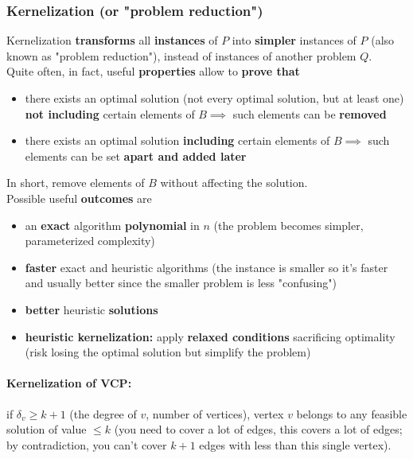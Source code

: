 \newpage

\subsubsection{Kernelization (or "problem reduction")}
Kernelization \textbf{transforms} all \textbf{instances} of $P$ into \textbf{simpler} instances of $P$ (also known as "problem reduction"), instead of instances of another problem $Q$.\\

Quite often, in fact, useful \textbf{properties} allow to \textbf{prove that}
\begin{itemize}
	\item there exists an optimal solution (not every optimal solution, but at least one) \textbf{not including} certain elements of $B \implies$ such elements can be \textbf{removed}
	\item there exists an optimal solution \textbf{including} certain elements of $B \implies$ such elements can be set \textbf{apart and added later}
\end{itemize}
In short, remove elements of $B$ without affecting the solution.\\

Possible useful \textbf{outcomes} are
\begin{itemize}
	\item an \textbf{exact} algorithm \textbf{polynomial} in $n$ (the problem becomes simpler, parameterized complexity)
	\item \textbf{faster} exact and heuristic algorithms (the instance is smaller so it's faster and usually better since the smaller problem is less "confusing")
	\item \textbf{better} heuristic \textbf{solutions}
	\item \textbf{heuristic kernelization:} apply \textbf{relaxed conditions} sacrificing optimality (risk losing the optimal solution but simplify the problem)
\end{itemize}

\newpage

\paragraph{Kernelization of VCP:} if $\delta_v \geq k+1$ (the degree of $v$, number of vertices), vertex $v$ belongs to any feasible solution of value $\leq k$ (you need to cover a lot of edges, this covers a lot of edges; by contradiction, you can't cover $k+1$ edges with less than this single vertex).\\

